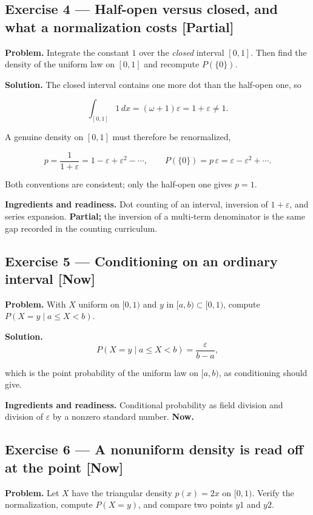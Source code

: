 \documentclass[11pt]{article}
\newcommand{\eps}{\varepsilon}
\renewcommand{\epsilon}{\varepsilon}
\begin{document}
\subsection*{Exercise 4 --- Half-open versus closed, and what a normalization costs \hfill \normalfont\small[Partial]}

\textbf{Problem.} Integrate the constant $1$ over the \emph{closed} interval $[0,1]$. Then
find the density of the uniform law on $[0,1]$ and recompute $P(\{0\})$.

\textbf{Solution.} The closed interval contains one more dot than the half-open
one, so

\[
\int_{[0,1]} 1\,dx=(\omega+1)\epsilon=1+\epsilon\neq 1 .
\]

A genuine density on $[0,1]$ must therefore be renormalized,

\[
p=\frac1{1+\epsilon}=1-\epsilon+\epsilon^{2}-\cdots,
\qquad
P(\{0\})=p\,\epsilon=\epsilon-\epsilon^{2}+\cdots .
\]

Both conventions are consistent; only the half-open one gives $p = 1$.

\textbf{Ingredients and readiness.} Dot counting of an interval, inversion of
$1 + \eps$, and series expansion. \textbf{Partial;} the inversion of a
multi-term denominator is the same gap recorded in the counting curriculum.


\subsection*{Exercise 5 --- Conditioning on an ordinary interval \hfill \normalfont\small[Now]}

\textbf{Problem.} With $X$ uniform on $[0,1)$ and $y$ in $[a,b)\subset [0,1)$,
compute $P(X = y\mid a \le  X < b)$.

\textbf{Solution.} \[
P(X=y \mid a\le X<b)=\frac{\epsilon}{b-a},
\]

which is the point probability of the uniform law on $[a,b)$, as conditioning
should give.

\textbf{Ingredients and readiness.} Conditional probability as field division and
division of $\eps$ by a nonzero standard number. \textbf{Now.}


\subsection*{Exercise 6 --- A nonuniform density is read off at the point \hfill \normalfont\small[Now]}

\textbf{Problem.} Let $X$ have the triangular density $p(x) = 2x$ on $[0,1)$.
Verify the normalization, compute $P(X = y)$, and compare two points $y1$ and
$y2$.
\end{document}
